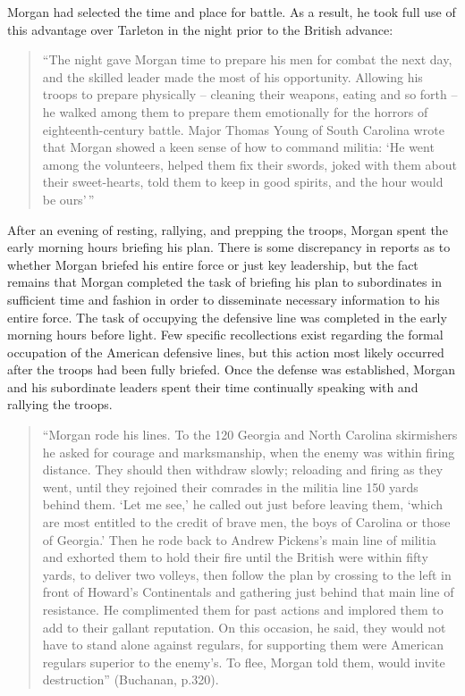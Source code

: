 Morgan had selected the time and place for battle.  As a result, he took full
use of this advantage over Tarleton in the night prior to the British advance:

\begin{quote}
  ``The night gave Morgan time to prepare his men for combat the next day, and
  the skilled leader made the most of his opportunity. Allowing his troops to
  prepare physically -- cleaning their weapons, eating and so forth -- he walked
  among them to prepare them emotionally for the horrors of eighteenth-century
  battle. Major Thomas Young of South Carolina wrote that Morgan showed a keen
  sense of how to command militia: `He went among the volunteers, helped them
  fix their swords, joked with them about their sweet-hearts, told them to keep
  in good spirits, and the hour would be ours'\,'' \cite[47]{moncure_cowpens_1996}
\end{quote}

After an evening of resting, rallying, and prepping the troops, Morgan spent the
early morning hours briefing his plan.  There is some discrepancy in reports as
to whether Morgan briefed his entire force or just key leadership, but the fact
remains that Morgan completed the task of briefing his plan to subordinates in
sufficient time and fashion in order to disseminate necessary information to his
entire force.   The task of occupying the defensive line was completed in the
early morning hours before light.  Few specific recollections exist regarding
the formal occupation of the American defensive lines, but this action most
likely occurred after the troops had been fully briefed.   Once the defense was
established, Morgan and his subordinate leaders spent their time continually
speaking with and rallying the troops. 

\begin{quote}
“Morgan rode his lines.  To the 120 Georgia and North Carolina skirmishers he
asked for courage and marksmanship, when the enemy was within firing distance.
They should then withdraw slowly; reloading and firing as they went, until they
rejoined their comrades in the militia line 150 yards behind them. ‘Let me see,’
he called out just before leaving them, ‘which are most entitled to the credit
of brave men, the boys of Carolina or those of Georgia.’ Then he rode back to
Andrew Pickens’s main line of militia and exhorted them to hold their fire until
the British were within fifty yards, to deliver two volleys, then follow the
plan by crossing to the left in front of Howard’s Continentals and gathering
just behind that main line of resistance.  He complimented them for past actions
and implored them to add to their gallant reputation.  On this occasion, he
said, they would not have to stand alone against regulars, for supporting them
were American regulars superior to the enemy’s.  To flee, Morgan told them,
would invite destruction” (Buchanan, p.320).
\end{quote}


